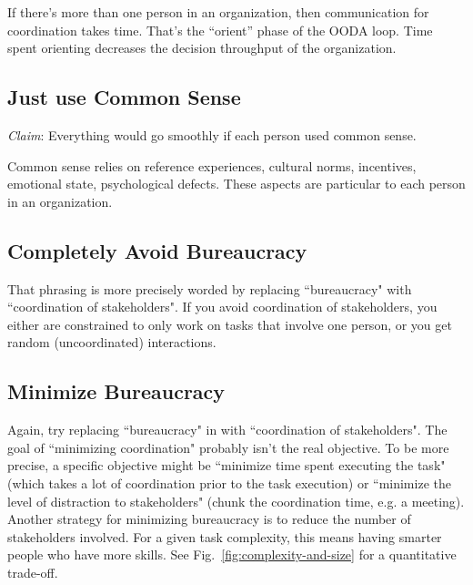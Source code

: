 
If there's more than one person in an organization, then communication for coordination takes time. That's the ``orient'' phase of the OODA loop. Time spent orienting decreases the decision throughput of the organization.



\subsection{Just use Common Sense}
\textit{Claim}: Everything would go smoothly if each person used common sense.

Common sense relies on reference experiences, cultural norms, incentives, emotional state, psychological defects. These aspects are particular to each person in an organization. 


\subsection{Completely Avoid Bureaucracy}
That phrasing is more precisely worded by replacing ``bureaucracy" with ``coordination of stakeholders". If you avoid coordination of stakeholders, you either are constrained to only work on tasks that involve one person, or you get random (uncoordinated) interactions. 

\subsection{Minimize Bureaucracy}
Again, try replacing ``bureaucracy" in with ``coordination of stakeholders". The goal of ``minimizing coordination" probably isn't the real objective. To be more precise, a specific objective might be ``minimize time spent executing the task" (which takes a lot of coordination prior to the task execution) or ``minimize the level of distraction to stakeholders" (chunk the coordination time, e.g. a meeting). Another strategy for minimizing bureaucracy is to reduce the number of stakeholders involved. For a given task complexity, this means having smarter people who have more skills. See Fig.~\ref{fig:complexity-and-size} for a quantitative trade-off. 


